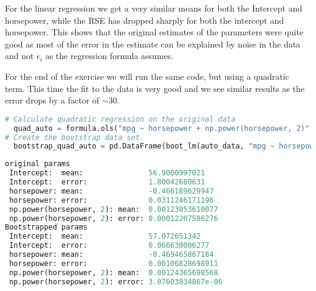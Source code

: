 For the linear regression we get a very similar means for both the Intercept and horsepower, while the RSE has dropped sharply for both the intercept and horsepower. This shows that the original estimates of the parameters were quite good as most of the error in the estimate can be explained by noise in the data and not $\epsilon_i$ as the regression formula assumes.

For the end of the exercise we will run the same code, but using a quadratic term. This time the fit to the data is very good and we see similar results as the error drops by a factor of $\sim30$.

\begin{lstlisting}[language=Python]
# Calculate quadratic regression on the original data
  quad_auto = formula.ols("mpg ~ horsepower + np.power(horsepower, 2)", data=auto_data).fit()
# Create the bootstrap data set.
  bootstrap_quad_auto = pd.DataFrame(boot_lm(auto_data, "mpg ~ horsepower + np.power(horsepower, 2)", 1000))
\end{lstlisting}
\begin{lstlisting}[language=Python]
original params
 Intercept:  mean:               56.9000997021
 Intercept:  error:              1.80042680631
 horsepower: mean:               -0.466189629947
 horsepower: error:              0.0311246171196
 np.power(horsepower, 2): mean:  0.00123053610077
 np.power(horsepower, 2): error: 0.00012207586276
Bootstrapped params
 Intercept:  mean:               57.072651342
 Intercept:  error:              0.066630006277
 horsepower: mean:               -0.469465867184
 horsepower: error:              0.00106828698911
 np.power(horsepower, 2): mean:  0.00124365698568
 np.power(horsepower, 2): error: 3.87603834867e-06
\end{lstlisting}



